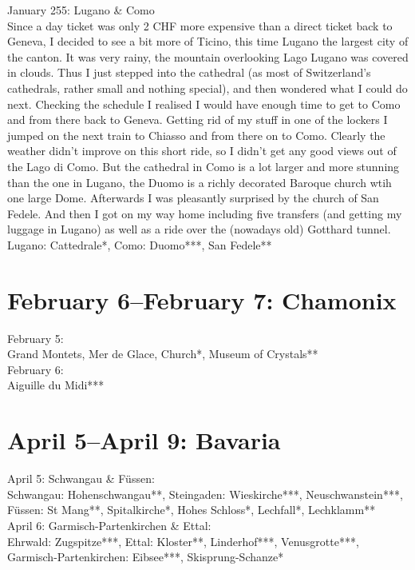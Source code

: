 January 255: Lugano \& Como\\
Since a day ticket was only 2 CHF more expensive than a direct ticket back to Geneva, I decided to see a bit more of Ticino, this time Lugano the largest city of the canton. It was very rainy, the mountain overlooking Lago Lugano was covered in clouds. Thus I just stepped into the cathedral (as most of Switzerland's cathedrals, rather small and nothing special), and then wondered what I could do next. Checking the schedule I realised I would have enough time to get to Como and from there back to Geneva. Getting rid of my stuff in one of the lockers I jumped on the next train to Chiasso and from there on to Como. Clearly the weather didn't improve on this short ride, so I didn't get any good views out of the Lago di Como. But the cathedral in Como is a lot larger and more stunning than the one in Lugano, the Duomo is a richly decorated Baroque church wtih one large Dome. Afterwards I was pleasantly surprised by the church of San Fedele. And then I got on my way home including five transfers (and getting my luggage in Lugano) as well as a ride over the (nowadays old) Gotthard tunnel.\\

Lugano: Cattedrale*, Como: Duomo***, San Fedele**

\section{February 6--February 7: Chamonix}
\label{Chamonix2010}

February 5:\\
Grand Montets, Mer de Glace, Church*, Museum of Crystals**\\

February 6:\\
Aiguille du Midi***

\section{April 5--April 9: Bavaria}
\label{2010:Bavaria}

April 5: Schwangau \& F\"ussen:\\
Schwangau: Hohenschwangau**, Steingaden: Wieskirche***, Neuschwanstein***, F\"ussen: St Mang**, Spitalkirche*, Hohes Schloss*, Lechfall*, Lechklamm**\\

April 6: Garmisch-Partenkirchen \& Ettal:\\
Ehrwald: Zugspitze***, Ettal: Kloster**, Linderhof***, Venusgrotte***, Garmisch-Partenkirchen: Eibsee***, Skisprung-Schanze*\\

